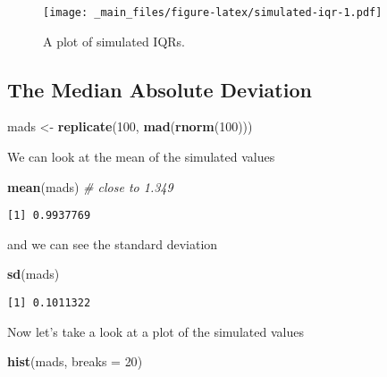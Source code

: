 \documentclass[]{book}
\newenvironment{Shaded}{\begin{snugshade}}{\end{snugshade}}
\newcommand{\KeywordTok}[1]{\textcolor[rgb]{0.13,0.29,0.53}{\textbf{{#1}}}}
\newcommand{\DataTypeTok}[1]{\textcolor[rgb]{0.13,0.29,0.53}{{#1}}}
\newcommand{\DecValTok}[1]{\textcolor[rgb]{0.00,0.00,0.81}{{#1}}}
\newcommand{\StringTok}[1]{\textcolor[rgb]{0.31,0.60,0.02}{{#1}}}
\newcommand{\CommentTok}[1]{\textcolor[rgb]{0.56,0.35,0.01}{\textit{{#1}}}}
\newcommand{\NormalTok}[1]{{#1}}
\numberwithin{equation}{chapter}
\numberwithin{figure}{chapter}
\theoremstyle{plain}
\theoremstyle{definition}
\theoremstyle{remark}
\theoremstyle{definition}
\theoremstyle{definition}
\theoremstyle{remark}
\begin{document}
\begin{figure}[htbp]
\centering
\texttt{[image: \_main\_files/figure-latex/simulated-iqr-1.pdf]}
\caption{\label{fig:simulated-iqr}\small A plot of simulated IQRs.}
\end{figure}



\subsection{The Median Absolute
Deviation}\label{the-median-absolute-deviation}

\begin{Shaded}
\begin{Highlighting}[]
\NormalTok{mads <-}\StringTok{ }\KeywordTok{replicate}\NormalTok{(}\DecValTok{100}\NormalTok{, }\KeywordTok{mad}\NormalTok{(}\KeywordTok{rnorm}\NormalTok{(}\DecValTok{100}\NormalTok{)))}
\end{Highlighting}
\end{Shaded}

We can look at the mean of the simulated values

\begin{Shaded}
\begin{Highlighting}[]
\KeywordTok{mean}\NormalTok{(mads)    }\CommentTok{# close to 1.349}
\end{Highlighting}
\end{Shaded}

\begin{verbatim}
[1] 0.9937769
\end{verbatim}

and we can see the standard deviation

\begin{Shaded}
\begin{Highlighting}[]
\KeywordTok{sd}\NormalTok{(mads)}
\end{Highlighting}
\end{Shaded}

\begin{verbatim}
[1] 0.1011322
\end{verbatim}

Now let's take a look at a plot of the simulated values

\begin{Shaded}
\begin{Highlighting}[]
\KeywordTok{hist}\NormalTok{(mads, }\DataTypeTok{breaks =} \DecValTok{20}\NormalTok{)}
\end{Highlighting}
\end{Shaded}
\end{document}
